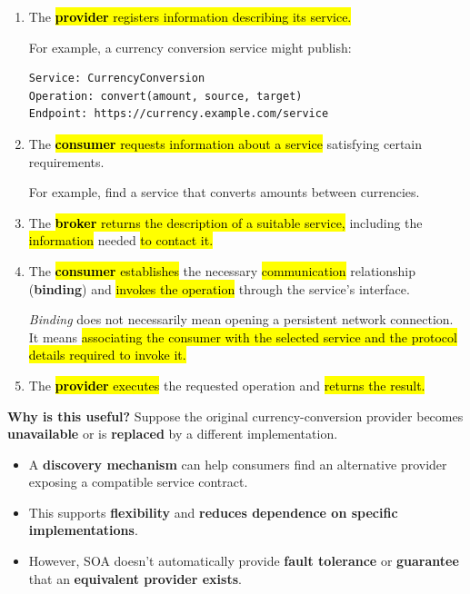 \begin{enumerate}[label={\important{Step \arabic*:}}, leftmargin=1.6cm]
    \item {} The \hl{\textbf{provider} registers information describing its service.}
        \begin{examplebox}
            For example, a currency conversion service might publish:
\begin{lstlisting}
Service: CurrencyConversion
Operation: convert(amount, source, target)
Endpoint: https://currency.example.com/service
\end{lstlisting}
        \end{examplebox}

    \item {} The \hl{\textbf{consumer} requests information about a service} satisfying certain requirements.
        \begin{examplebox}
            For example, find a service that converts amounts between currencies.
        \end{examplebox}

    \item {} The \hl{\textbf{broker} returns the description of a suitable service,} including the \hl{information} needed \hl{to contact it.}

    \item {} The \hl{\textbf{consumer} establishes} the necessary \hl{communication} relationship (\textbf{binding}) and \hl{invokes the operation} through the service's interface.

        \emph{Binding} does not necessarily mean opening a persistent network connection. It means \hl{associating the consumer with the selected service and the protocol details required to invoke it.}

    \item {} The \hl{\textbf{provider} executes} the requested operation and \hl{returns the result.}
\end{enumerate}
\textcolor{Green3}{ \textbf{Why is this useful?}} Suppose the original currency-conversion provider becomes \textbf{unavailable} or is \textbf{replaced} by a different implementation.
\begin{itemize}
    \item[\textcolor{Green3}{\faIcon{check}}] A \textbf{discovery mechanism} can help consumers find an alternative provider exposing a compatible service contract.
    \item[\textcolor{Green3}{\faIcon{check}}] This supports \textbf{flexibility} and \textbf{reduces dependence on specific implementations}.
    \item[\textcolor{Red2}{\faIcon{times}}] However, SOA doesn't automatically provide \textbf{fault tolerance} or \textbf{guarantee} that an \textbf{equivalent provider exists}.
\end{itemize}
